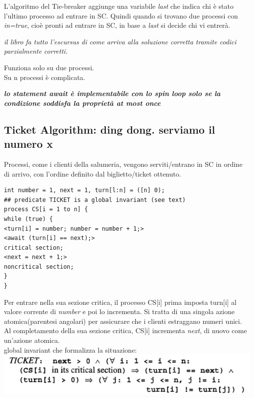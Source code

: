 \documentclass[10pt,a4paper]{book}
\begin{document}
L'algoritmo del Tie-breaker aggiunge una variabile \textit{last} che indica chi è stato l'ultimo processo ad entrare in SC. Quindi quando si trovano due processi con \textit{in=true}, cioè pronti ad entrare in SC, in base a \textit{last} si decide chi vi entrerà.

\textit{il libro fa tutto l'escursus di come arriva alla soluzione corretta tramite codici parzialmente corretti.}

Funziona solo su due processi.\\
Su n processi è complicata.


\textbf{\textit{lo statement await è implementabile con lo spin loop solo se la condizione soddisfa la proprietà at most once}}\\


\subsection{Ticket Algorithm: ding dong. serviamo il numero x}
Processi, come i clienti della salumeria, vengono serviti/entrano in SC in ordine di arrivo, con l'ordine definito dal biglietto/ticket ottenuto.
\begin{verbatim}
int number = 1, next = 1, turn[l:n] = ([n] 0);
## predicate TICKET is a global invariant (see text)
process CS[i = 1 to n] {
while (true) {
<turn[i] = number; number = number + 1;>
<await (turn[i] == next);>
critical section;
<next = next + 1;>
noncritical section;
}
}
\end{verbatim}

Per entrare nella sua sezione critica, il processo CS[i] prima imposta turn[i] al valore corrente di \textit{number} e poi lo incrementa. Si tratta di una singola azione atomica(parentesi angolari) per assicurare che i clienti estraggano numeri unici. Al completamento della sua sezione critica, CS[i] incrementa \textit{next}, di nuovo come un'azione atomica.\\
global invariant che formalizza la situazione:\\
\includegraphics[scale=0.4]{img/ticket.png} \\
\end{document}
